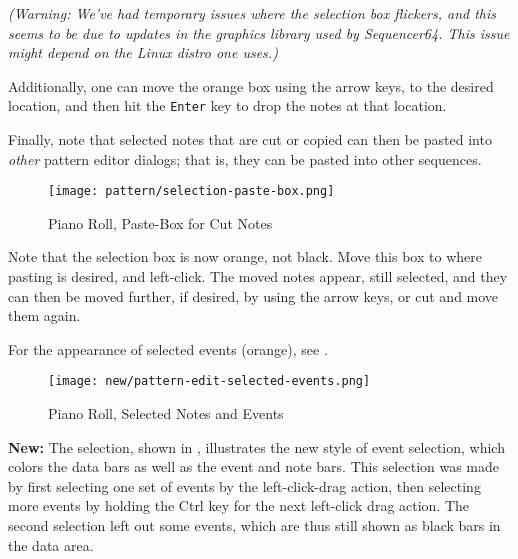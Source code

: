    \textsl{
   (Warning:  We've had temporary issues where the selection box flickers, and
   this seems to be due to updates in the graphics library used by
   \textsl{Sequencer64}.  This issue might depend on the Linux distro one
   uses.)
   }

   Additionally, one can move the orange box using the arrow keys, to the
   desired location, and then hit the
    \texttt{Enter} key to
   drop the notes at that location.

   Finally, note that selected notes that are cut or copied can then be
   pasted into \textsl{other} pattern editor dialogs; that is, they can be
   pasted into other sequences.

\begin{figure}[H]
   \centering 
   \texttt{[image: pattern/selection-paste-box.png]}
   \caption{Piano Roll, Paste-Box for Cut Notes}
   \label{fig:pattern_editor_selection_paste_box}
\end{figure}
   
   Note that the selection box is now orange, not black.
   Move this box to where pasting is
   desired, and left-click.  The moved notes appear, still selected,
   and they can then be moved further, if desired, by using the arrow keys, or
   cut and move them again.

   For the appearance of selected events (orange), see
   .

\begin{figure}[H]
   \centering 
   \texttt{[image: new/pattern-edit-selected-events.png]}
   \caption{Piano Roll, Selected Notes and Events}
   \label{fig:pattern_editor_selected_events}
\end{figure}

   \textbf{New:}
   The selection, shown in
   ,
   illustrates the new style of event selection, which colors the data
   bars as well as the event and note bars.  This selection was made by first
   selecting one set of events by the
   left-click-drag action, then
   selecting more events by holding the Ctrl key for the next left-click drag
   action.  The second selection left out some events, which are thus still
   shown as black bars in the data area.

